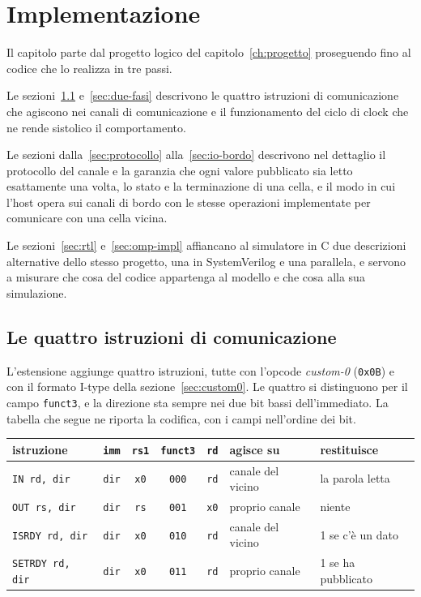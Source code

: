 \chapter{Implementazione}
\label{ch:implementazione}

Il capitolo parte dal progetto logico del capitolo~\ref{ch:progetto} proseguendo fino al codice
che lo realizza in tre passi. 

Le sezioni~\ref{sec:istruzioni} e~\ref{sec:due-fasi} descrivono le quattro istruzioni di comunicazione che agiscono nei
canali di comunicazione e il funzionamento del ciclo di clock che ne rende sistolico il 
comportamento. 

Le sezioni dalla~\ref{sec:protocollo} alla~\ref{sec:io-bordo} descrivono nel dettaglio il protocollo del canale e la
garanzia che ogni valore pubblicato sia letto esattamente una volta, lo stato e
la terminazione di una cella, e il modo in cui l'host opera sui canali di bordo
con le stesse operazioni implementate per comunicare con una cella vicina.

Le sezioni~\ref{sec:rtl} e~\ref{sec:omp-impl} affiancano al simulatore in C due
descrizioni alternative dello stesso progetto, una in SystemVerilog e una
parallela, e servono a misurare che cosa del codice appartenga al modello e che
cosa alla sua simulazione.

\section{Le quattro istruzioni di comunicazione}
\label{sec:istruzioni}

L'estensione aggiunge quattro istruzioni, tutte con l'opcode \emph{custom-0}
(\texttt{0x0B}) e con il formato I-type della sezione~\ref{sec:custom0}. Le
quattro si distinguono per il campo \texttt{funct3}, e la direzione sta sempre
nei due bit bassi dell'immediato. La tabella che segue ne riporta la
codifica, con i campi nell'ordine dei bit.

\begin{center}
\begin{tabular}{lccccll}
    \toprule
    istruzione & \texttt{imm} & \texttt{rs1} & \texttt{funct3} & \texttt{rd} & agisce su & restituisce \\
    \midrule
    \texttt{IN rd, dir}     & \texttt{dir} & \texttt{x0} & \texttt{000} & \texttt{rd} & canale del vicino & la parola letta \\
    \texttt{OUT rs, dir}    & \texttt{dir} & \texttt{rs} & \texttt{001} & \texttt{x0} & proprio canale    & niente \\
    \texttt{ISRDY rd, dir}  & \texttt{dir} & \texttt{x0} & \texttt{010} & \texttt{rd} & canale del vicino & 1 se c'è un dato \\
    \texttt{SETRDY rd, dir} & \texttt{dir} & \texttt{x0} & \texttt{011} & \texttt{rd} & proprio canale    & 1 se ha pubblicato \\
    \bottomrule
\end{tabular}
\end{center}

